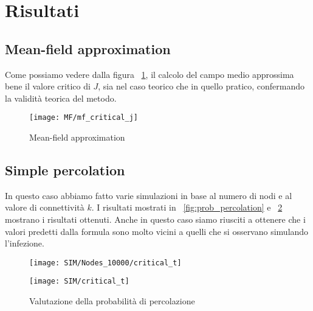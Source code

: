 \section{Risultati}\label{sec:risultati}

\subsection{Mean-field approximation}\label{subsec:res-mean-field-approximation}
    Come possiamo vedere dalla figura ~\ref{fig:mf_critical_j}, il calcolo del campo medio approssima bene il valore
    critico di $J$, sia nel caso teorico che in quello pratico, confermando la validità teorica del metodo.

    \begin{figure}[H]
        \texttt{[image: MF/mf\_critical\_j]}\caption{Mean-field approximation}
        \label{fig:mf_critical_j}
    \end{figure}

\subsection{Simple percolation}\label{subsec:res-simple-percolation}
    In questo caso abbiamo fatto varie simulazioni in base al numero di nodi e al valore di connettività $k$.
    I risultati mostrati in ~\ref{fig:prob_percolation} e ~\ref{fig:prob_percolation_2} mostrano i risultati ottenuti.
    Anche in questo caso siamo riusciti a ottenere che i valori predetti dalla formula sono molto vicini a
    quelli che si osservano simulando l'infezione.

    \begin{figure}[H]
        \begin{minipage}{0.5\textwidth}
            \texttt{[image: SIM/Nodes\_10000/critical\_t]}\label{fig:prob_percolation}
        \end{minipage}
        \begin{minipage}{0.5\textwidth}
            \texttt{[image: SIM/critical\_t]}\label{fig:prob_percolation_2}
        \end{minipage}
        \caption{Valutazione della probabilità di percolazione}
    \end{figure}

